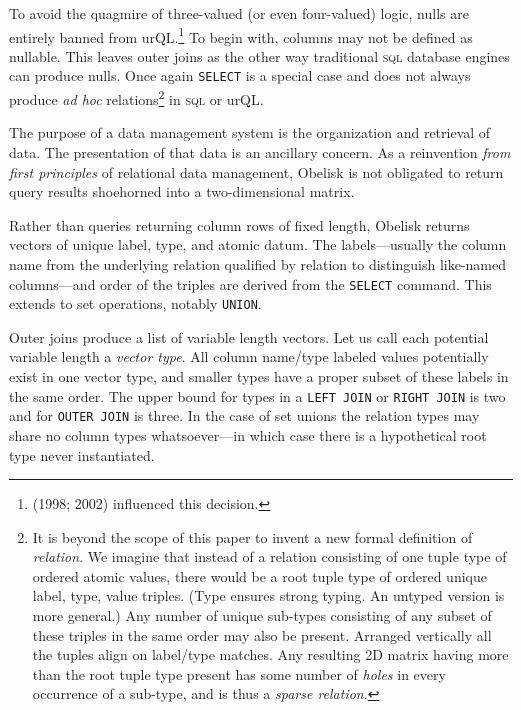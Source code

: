 \documentclass[twoside]{article}
\begin{document}
To avoid the quagmire of three-valued (or even four-valued) logic, nulls are entirely banned from urQL.\footnote{\citeauthor{DarwenDate1998} (1998; 2002)
influenced this decision.} To begin with, columns may not be defined as nullable. This leaves outer joins as the other way traditional \textsc{sql} database engines can produce nulls. Once again \lstinline[style=inlinecode]{SELECT} is a special case and does not always produce \emph{ad hoc} relations\footnote{It is beyond the scope of this paper to invent a new formal definition of \emph{relation}. We imagine that instead of a relation consisting of one tuple type of ordered atomic values, there would be a root tuple type of ordered unique label, type, value triples. (Type ensures strong typing. An untyped version is more general.) Any number of unique sub-types consisting of any subset of these triples in the same order may also be present. Arranged vertically all the tuples align on label/type matches. Any resulting 2D matrix having more than the root tuple type present has some number of \emph{holes} in every occurrence of a sub-type, and is thus a \emph{sparse relation}.} in \textsc{sql} or urQL.

The purpose of a data management system is the organization and retrieval of data. The presentation of that data is an ancillary concern. As a reinvention \emph{from first principles} of \mbox{relational} data management, Obelisk is not obligated to return query results shoehorned into a two-dimensional matrix.

Rather than queries returning column rows of fixed length, Obelisk returns vectors of unique label, type, and atomic \mbox{datum}. The labels---usually the column name from the underlying relation qualified by relation to distinguish like-named columns---and order of the triples are derived from the \lstinline[style=inlinecode]{SELECT} command. This extends to set operations, notably \lstinline[style=inlinecode]{UNION}.

Outer joins produce a list of variable length vectors. Let us call each potential variable length a \emph{vector type}. All \mbox{column} name/type labeled values potentially exist in one vector type, and smaller types have a proper subset of these labels in the same order. The upper bound for types in a \lstinline[style=inlinecode]{LEFT JOIN} or \lstinline[style=inlinecode]{RIGHT JOIN} is two and for \lstinline[style=inlinecode]{OUTER JOIN} is three. In the case of set unions the relation types may share no column types whatsoever---in which case there is a hypothetical root type never instantiated.
\end{document}

